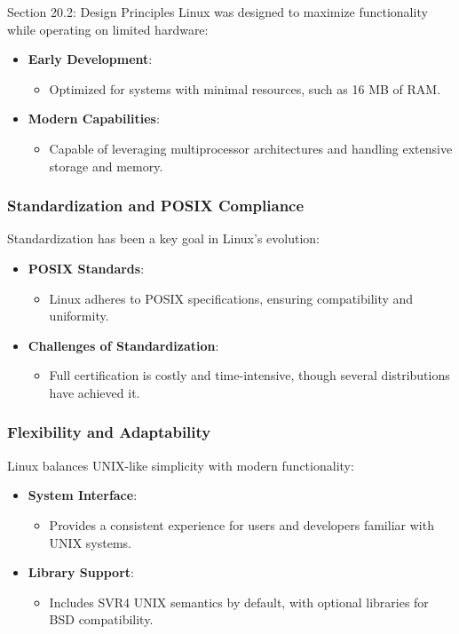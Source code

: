 \begin{notes}{Section 20.2: Design Principles}
    Linux was designed to maximize functionality while operating on limited hardware:
    \begin{itemize}
        \item \textbf{Early Development}:
        \begin{itemize}
            \item Optimized for systems with minimal resources, such as 16 MB of RAM.
        \end{itemize}
        \item \textbf{Modern Capabilities}:
        \begin{itemize}
            \item Capable of leveraging multiprocessor architectures and handling extensive storage and memory.
        \end{itemize}
    \end{itemize}
    
    \subsubsection*{Standardization and POSIX Compliance}
    
    Standardization has been a key goal in Linux's evolution:
    \begin{itemize}
        \item \textbf{POSIX Standards}:
        \begin{itemize}
            \item Linux adheres to POSIX specifications, ensuring compatibility and uniformity.
        \end{itemize}
        \item \textbf{Challenges of Standardization}:
        \begin{itemize}
            \item Full certification is costly and time-intensive, though several distributions have achieved it.
        \end{itemize}
    \end{itemize}
    
    \subsubsection*{Flexibility and Adaptability}
    
    Linux balances UNIX-like simplicity with modern functionality:
    \begin{itemize}
        \item \textbf{System Interface}:
        \begin{itemize}
            \item Provides a consistent experience for users and developers familiar with UNIX systems.
        \end{itemize}
        \item \textbf{Library Support}:
        \begin{itemize}
            \item Includes SVR4 UNIX semantics by default, with optional libraries for BSD compatibility.
        \end{itemize}
    \end{itemize}
    

\end{notes}

